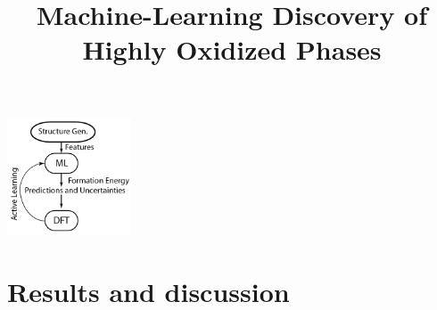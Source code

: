 \documentclass[journal=jacsat,manuscript=article,layout=twocolumn]{achemso}
\title[ML discovered IrOx phases]{
  Machine-Learning Discovery of Highly Oxidized \IrOx Phases}
\begin{document}
\begin{tocentry}
\begin{center}
\includegraphics[height=3.5cm]{02_figures/Surrogate_model}
\end{center}
\end{tocentry}


% 
%
% 

\section{Results and discussion}

\end{document}
